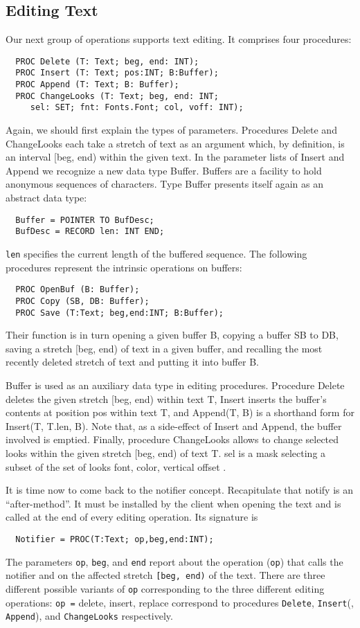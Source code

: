 \subsection{Editing Text}
Our next group of operations supports text editing. It comprises four procedures:
\begin{verbatim}
  PROC Delete (T: Text; beg, end: INT);
  PROC Insert (T: Text; pos:INT; B:Buffer);
  PROC Append (T: Text; B: Buffer);
  PROC ChangeLooks (T: Text; beg, end: INT;
     sel: SET; fnt: Fonts.Font; col, voff: INT);
\end{verbatim}
Again, we should first explain the types of parameters. Procedures Delete and ChangeLooks each
take a stretch of text as an argument which, by definition, is an interval [beg, end) within the given
text. In the parameter lists of Insert and Append we recognize a new data type Buffer.
Buffers are a facility to hold anonymous sequences of characters. Type Buffer presents itself again
as an abstract data type:
\begin{verbatim}
  Buffer = POINTER TO BufDesc;
  BufDesc = RECORD len: INT END;
\end{verbatim}
\verb|len| specifies the current length of the buffered sequence. The following procedures represent the intrinsic operations on buffers:
\begin{verbatim}
  PROC OpenBuf (B: Buffer);
  PROC Copy (SB, DB: Buffer);
  PROC Save (T:Text; beg,end:INT; B:Buffer);
\end{verbatim}

Their function is in turn opening a given buffer B, copying a buffer SB to DB, saving a stretch [beg,
end) of text in a given buffer, and recalling the most recently deleted stretch of text and putting it
into buffer B.

Buffer is used as an auxiliary data type in editing procedures. Procedure Delete deletes the given
stretch [beg, end) within text T, Insert inserts the buffer's contents at position pos within text T, and
Append(T, B) is a shorthand form for Insert(T, T.len, B). Note that, as a side-effect of Insert and
Append, the buffer involved is emptied. Finally, procedure ChangeLooks allows to change selected
looks within the given stretch [beg, end) of text T. sel is a mask selecting a subset of the set of
looks { font, color, vertical offset }.

It is time now to come back to the notifier concept. Recapitulate that notify is an “after-method”. It
must be installed by the client when opening the text and is called at the end of every editing
operation. Its signature is
\begin{verbatim}
  Notifier = PROC(T:Text; op,beg,end:INT);
\end{verbatim}
The parameters \verb|op|, \verb|beg|, and \verb|end| report about the operation (\verb|op|) that calls the notifier and on the
affected stretch \verb|[beg, end)| of the text. There are three different possible variants of \verb|op|
corresponding to the three different editing operations: \verb|op =| delete, insert, replace correspond to
procedures \verb|Delete|, \verb|Insert|(, \verb|Append|), and \verb|ChangeLooks| respectively.

